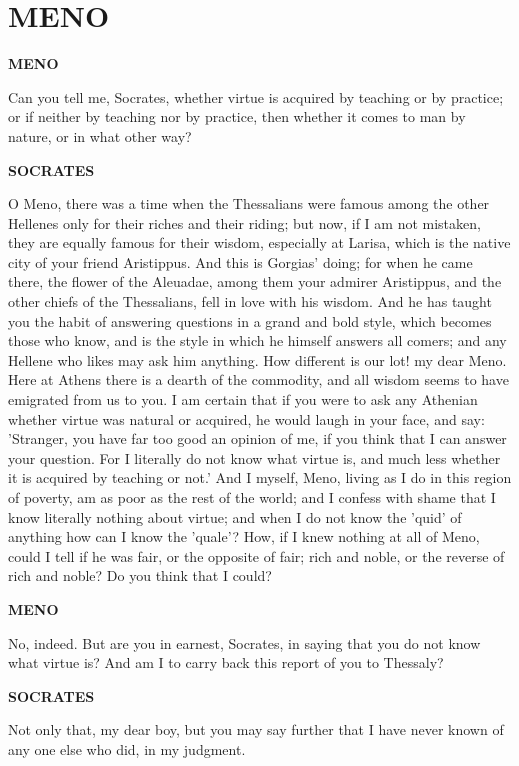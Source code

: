 \documentclass[11pt,letter]{article}
\begin{document}
\par 
\section{
      MENO
    } 
\par \textbf{MENO}
\par   Can you tell me, Socrates, whether virtue is acquired by teaching or by practice; or if neither by teaching nor by practice, then whether it comes to man by nature, or in what other way?

\par \textbf{SOCRATES}
\par   O Meno, there was a time when the Thessalians were famous among the other Hellenes only for their riches and their riding; but now, if I am not mistaken, they are equally famous for their wisdom, especially at Larisa, which is the native city of your friend Aristippus. And this is Gorgias' doing; for when he came there, the flower of the Aleuadae, among them your admirer Aristippus, and the other chiefs of the Thessalians, fell in love with his wisdom. And he has taught you the habit of answering questions in a grand and bold style, which becomes those who know, and is the style in which he himself answers all comers; and any Hellene who likes may ask him anything. How different is our lot! my dear Meno. Here at Athens there is a dearth of the commodity, and all wisdom seems to have emigrated from us to you. I am certain that if you were to ask any Athenian whether virtue was natural or acquired, he would laugh in your face, and say:  'Stranger, you have far too good an opinion of me, if you think that I can answer your question. For I literally do not know what virtue is, and much less whether it is acquired by teaching or not.' And I myself, Meno, living as I do in this region of poverty, am as poor as the rest of the world; and I confess with shame that I know literally nothing about virtue; and when I do not know the 'quid' of anything how can I know the 'quale'? How, if I knew nothing at all of Meno, could I tell if he was fair, or the opposite of fair; rich and noble, or the reverse of rich and noble? Do you think that I could?

\par \textbf{MENO}
\par   No, indeed. But are you in earnest, Socrates, in saying that you do not know what virtue is? And am I to carry back this report of you to Thessaly?

\par \textbf{SOCRATES}
\par   Not only that, my dear boy, but you may say further that I have never known of any one else who did, in my judgment.
\end{document}
